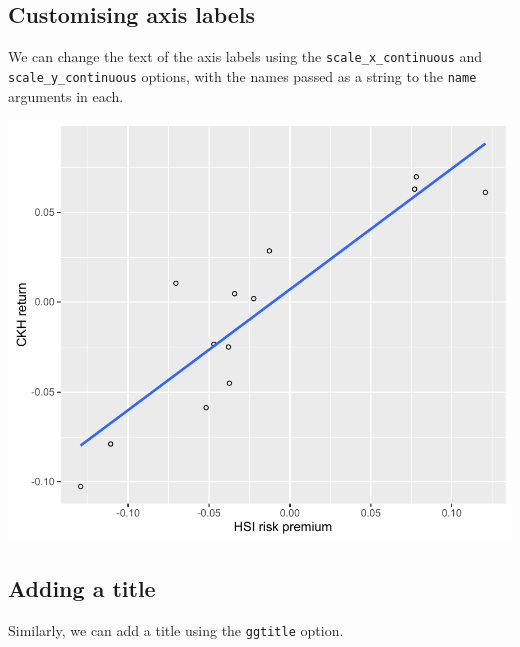 \subsection{Customising axis labels}\label{customising-axis-labels}

We can change the text of the axis labels using the
\texttt{scale\_x\_continuous} and \texttt{scale\_y\_continuous} options,
with the names passed as a string to the \texttt{name} arguments in
each.

\begin{Shaded}
\begin{Highlighting}[]
\StringTok{ }\StringTok{ }\NormalTok{(} \NormalTok{) +}\StringTok{ }
\StringTok{  }\NormalTok{(} \NormalTok{)}
\end{Highlighting}
\end{Shaded}

\begin{center}\includegraphics[width=0.6\linewidth]{11_Linear_Regression_Plot_pdf/lr_8-1} \end{center}

\subsection{Adding a title}\label{adding-a-title}

Similarly, we can add a title using the \texttt{ggtitle} option.

\begin{Shaded}
\begin{Highlighting}[]
\StringTok{ }\StringTok{ }\NormalTok{(}\NormalTok{)}
\end{Highlighting}
\end{Shaded}

